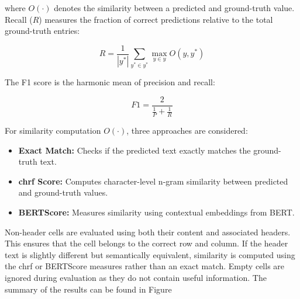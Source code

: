 \documentclass[12pt,a4paper]{article}
\begin{document}
where \( O(\cdot) \) denotes the similarity between a predicted and ground-truth value. Recall (\( R \)) measures the fraction of correct predictions relative to the total ground-truth entries:

\[
R = \frac{1}{|y^*|} \sum_{y^* \in y^*} \max_{y \in y} O(y, y^*)
\]

The F1 score is the harmonic mean of precision and recall:

\[
F1 = \frac{2}{\frac{1}{P} + \frac{1}{R}}
\]

For similarity computation \( O(\cdot) \), three approaches are considered:
\begin{itemize}
    \item \textbf{Exact Match:} Checks if the predicted text exactly matches the ground-truth text.
    \item \textbf{chrf Score:} Computes character-level n-gram similarity between predicted and ground-truth values.
    \item \textbf{BERTScore:} Measures similarity using contextual embeddings from BERT.
\end{itemize}

Non-header cells are evaluated using both their content and associated headers. This ensures that the cell belongs to the correct row and column. If the header text is slightly different but semantically equivalent, similarity is computed using the chrf or BERTScore measures rather than an exact match. Empty cells are ignored during evaluation as they do not contain useful information. The summary of the results can be found in Figure 
\end{document}
